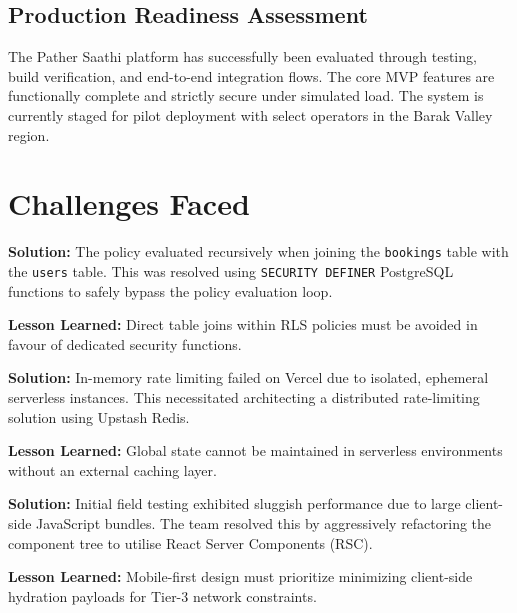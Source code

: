 \documentclass[12pt, a4paper, oneside]{report}
\begin{document}
\section{Production Readiness Assessment}
\begin{keyfinding}[title=\textbf{Production Status: Evaluated Ready}]
The Pather Saathi platform has successfully been evaluated through testing, build verification, and end-to-end integration flows. The core MVP features are functionally complete and strictly secure under simulated load. The system is currently staged for pilot deployment with select operators in the Barak Valley region.
\end{keyfinding}

\chapter{Challenges Faced}

\begin{challengebox}
\textbf{Solution:} The policy evaluated recursively when joining the \texttt{bookings} table with the \texttt{users} table. This was resolved using \texttt{SECURITY DEFINER} PostgreSQL functions to safely bypass the policy evaluation loop.

\vspace{0.5em}\noindent\textbf{Lesson Learned:} Direct table joins within RLS policies must be avoided in favour of dedicated security functions.
\end{challengebox}

\begin{challengebox}
\textbf{Solution:} In-memory rate limiting failed on Vercel due to isolated, ephemeral serverless instances. This necessitated architecting a distributed rate-limiting solution using Upstash Redis.

\vspace{0.5em}\noindent\textbf{Lesson Learned:} Global state cannot be maintained in serverless environments without an external caching layer.
\end{challengebox}

\begin{challengebox}
\textbf{Solution:} Initial field testing exhibited sluggish performance due to large client-side JavaScript bundles. The team resolved this by aggressively refactoring the component tree to utilise React Server Components (RSC).

\vspace{0.5em}\noindent\textbf{Lesson Learned:} Mobile-first design must prioritize minimizing client-side hydration payloads for Tier-3 network constraints.
\end{challengebox}
\end{document}
